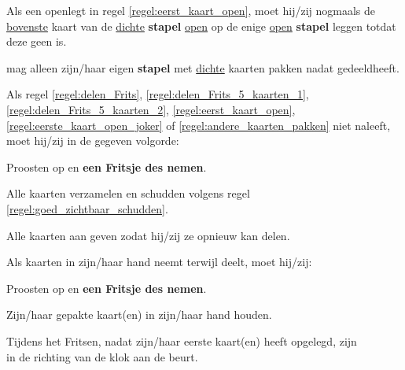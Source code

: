 \vervolgLijst{}
    \item Als \Frits een \footnotemark[2] openlegt in regel \ref{regel:eerst_kaart_open}, moet hij/zij nogmaals de \ul{bovenste} kaart van de \ul{dichte} \textbf{stapel} \ul{open} op de enige \ul{open} \textbf{stapel} leggen totdat deze geen \footnotemark[2] is.
    \label{regel:eerste_kaart_open_joker}
\eindLijst{}   

\vervolgLijst{}
    \item \EenSpeler mag alleen zijn/haar eigen \textbf{stapel} met \ul{dichte} kaarten pakken nadat \Frits gedeeld\footnotemark[1] heeft.
   \label{regel:andere_kaarten_pakken}
\eindLijst{}

\vervolgLijst{}
    \item Als \eenSpeler regel \ref{regel:delen_Frits}, \ref{regel:delen_Frits_5_kaarten_1}, \ref{regel:delen_Frits_5_kaarten_2}, \ref{regel:eerst_kaart_open}, \ref{regel:eerste_kaart_open_joker} of \ref{regel:andere_kaarten_pakken} niet naleeft, moet hij/zij in de gegeven volgorde:
    \puntLijst{}
        \item Proosten op  en \textbf{een Fritsje des nemen}\footnotemark[3].
        \item Alle kaarten verzamelen en schudden volgens regel \ref{regel:goed_zichtbaar_schudden}.
        \item Alle kaarten aan \Frits geven zodat hij/zij ze opnieuw kan delen.
    \eindPuntLijst{}
\eindLijst{}

\vervolgLijst{}
    \item Als \eenSpeler kaarten in zijn/haar hand neemt terwijl \Frits deelt\footnotemark[1], moet hij/zij:
     \puntLijst{}
         \item Proosten op  en \textbf{een Fritsje des nemen}\footnotemark[3].
         \item Zijn/haar gepakte kaart(en) in zijn/haar hand houden.
     \eindPuntLijst{}
\eindLijst{}


\vervolgLijst{}
    \item Tijdens het Fritsen, nadat \Willem zijn/haar eerste kaart(en) heeft opgelegd, zijn\\ \alleSpelers in de richting van de klok aan de beurt\footnotemark[4].
\eindLijst{}




